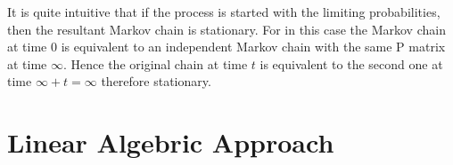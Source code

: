 \begin{remark}
    It is quite intuitive that if the process is started with the limiting probabilities, then the resultant Markov chain is stationary. 
    For in this case the Markov chain at time 0 is equivalent to an independent Markov chain with the same P matrix at time $ \infty $. 
    Hence the original chain at time $ t $ is equivalent to the second one at time $\infty + t = \infty$ therefore stationary.
\end{remark}

\section{Linear Algebric Approach}
